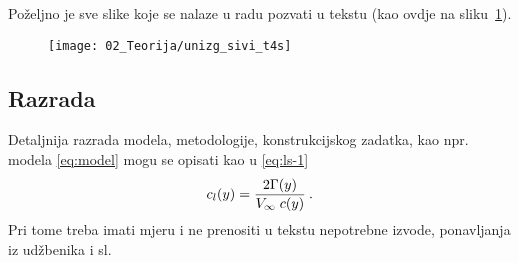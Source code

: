 Poželjno je sve slike koje se nalaze u radu pozvati u tekstu (kao ovdje na
sliku~\ref{fig:unizg}).
\begin{figure}[H]
  \centering
  \texttt{[image: 02\_Teorija/unizg\_sivi\_t4s]}\\
  \label{fig:unizg}
\end{figure}
%

\subsection{Razrada}
Detaljnija razrada modela, metodologije, konstrukcijskog zadatka, kao npr.
modela \eqref{eq:model} mogu se opisati kao u
\eqref{eq:ls-1}
\begin{equation}\label{eq:ls-1}
	c_l(y)=\frac{2\Gamma(y)}{\hbox{$V_{\infty}$}\;c(y)}\:.
\end{equation}
%
Pri tome treba imati mjeru i ne prenositi u tekstu nepotrebne izvode,
ponavljanja iz udžbenika i sl.
